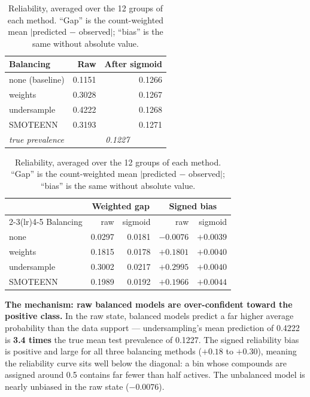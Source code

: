 \documentclass[10pt,letterpaper]{article}
\begin{document}
\begin{table}[!htbp]
\centering
\small
\begin{minipage}[t]{0.47\textwidth}
\centering
\caption{Mean predicted probability, pooled over the 36 test partitions of each method, against a
mean test prevalence of 0.1227.}
\label{tab:meanp}
\footnotesize
\begin{tabular}{@{}lrr@{}}
\toprule
Balancing & Raw & After sigmoid \\
\midrule
none (baseline) & 0.1151 & 0.1266 \\
weights         & 0.3028 & 0.1267 \\
undersample     & 0.4222 & 0.1268 \\
SMOTEENN        & 0.3193 & 0.1271 \\
\midrule
\textit{true prevalence} & \multicolumn{2}{c}{\textit{0.1227}} \\
\bottomrule
\end{tabular}
\end{minipage}\hfill
\begin{minipage}[t]{0.50\textwidth}
\centering
\caption{Reliability, averaged over the 12 groups of each method. ``Gap'' is the count-weighted mean
$|$predicted $-$ observed$|$; ``bias'' is the same without absolute value.}
\label{tab:reliab}
\footnotesize
\begin{tabular}{@{}lrrrr@{}}
\toprule
 & \multicolumn{2}{c}{Weighted gap} & \multicolumn{2}{c}{Signed bias} \\
\cmidrule(lr){2-3}\cmidrule(lr){4-5}
Balancing & raw & sigmoid & raw & sigmoid \\
\midrule
none        & 0.0297 & 0.0181 & $-0.0076$ & $+0.0039$ \\
weights     & 0.1815 & 0.0178 & $+0.1801$ & $+0.0040$ \\
undersample & 0.3002 & 0.0217 & $+0.2995$ & $+0.0040$ \\
SMOTEENN    & 0.1989 & 0.0192 & $+0.1966$ & $+0.0044$ \\
\bottomrule
\end{tabular}
\end{minipage}
\end{table}

\textbf{The mechanism: raw balanced models are over-confident toward the positive class.} In the raw
state, balanced models predict a far higher average probability than the data support ---
undersampling's mean prediction of 0.4222 is \textbf{3.4 times} the true mean test prevalence of
0.1227. The signed reliability bias is positive and large for all three balancing methods ($+0.18$ to
$+0.30$), meaning the reliability curve sits well below the diagonal: a bin whose compounds are
assigned around 0.5 contains far fewer than half actives. The unbalanced model is nearly unbiased in
the raw state ($-0.0076$).
\end{document}
